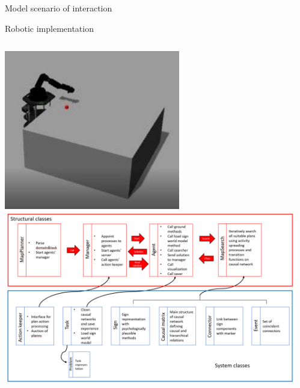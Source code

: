 \documentclass[default]{beamer}
\begin{document}
		\begin{frame}{Model scenario of interaction}
			\begin{center}
			\end{center}
		\end{frame}
		\begin{frame}{Robotic implementation}
		
		\begin{columns}
			\begin{column}{0.6\textwidth}
				\centering
				\includegraphics[width=0.6\textwidth]{misc/robots/gazebo.jpg}
				\includegraphics[width=\textwidth]{misc/robots/maplib.png}
			\end{column}
			\begin{column}{0.4\textwidth}

\end{column}
\end{columns}
\end{frame}
\end{document}
